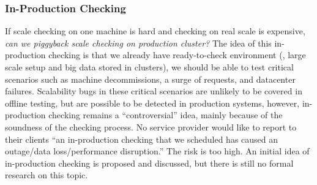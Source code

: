 \subsubsection{In-Production Checking}

If scale checking on one machine is hard and checking on real scale is
expensive, \textit{can we piggyback scale checking on production cluster?} The
idea of this in-production checking is that we already have ready-to-check
environment (\ie, large scale setup and big data stored in clusters), we should
be able to test critical scenarios such as machine decommissions, a surge of
requests, and datacenter failures. Scalability bugs in these critical scenarios
are unlikely to be covered in offline testing, but are possible to be detected
in production systems, however, in-production checking remains a
``controversial'' idea, mainly because of the soundness of the checking process.
No service provider would like to report to their clients ``an in-production
checking that we scheduled has caused an outage/data loss/performance
disruption.'' The risk is too high. An initial idea of in-production
checking is proposed \cite{Leesatapornwongsa+14-Drill} and discussed, but there
is still no formal research on this topic.

